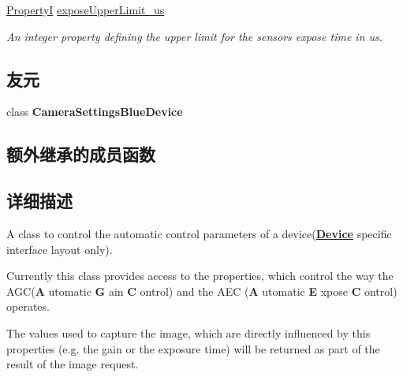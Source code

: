 \begin{DoxyCompactItemize}
\hyperlink{group___common_interface_ga12d5e434238ca242a1ba4c6c3ea45780}{Property\+I} \hyperlink{classmv_i_m_p_a_c_t_1_1acquire_1_1_auto_control_parameters_a31bdff657d33b72b9da836a2cdd61fea}{expose\+Upper\+Limit\+\_\+us}
\begin{DoxyCompactList}\small\item\em An integer property defining the upper limit for the sensors expose time in us. \end{DoxyCompactList}\end{DoxyCompactItemize}
\subsection*{友元}
\begin{DoxyCompactItemize}
\item 
\hypertarget{classmv_i_m_p_a_c_t_1_1acquire_1_1_auto_control_parameters_ab0b1cfcd287092b768c6b4206fb0ada0}{class {\bfseries Camera\+Settings\+Blue\+Device}}\label{classmv_i_m_p_a_c_t_1_1acquire_1_1_auto_control_parameters_ab0b1cfcd287092b768c6b4206fb0ada0}

\end{DoxyCompactItemize}
\subsection*{额外继承的成员函数}


\subsection{详细描述}
A class to control the automatic control parameters of a device({\bfseries \hyperlink{classmv_i_m_p_a_c_t_1_1acquire_1_1_device}{Device}} specific interface layout only). 

Currently this class provides access to the properties, which control the way the A\+G\+C({\bfseries A} utomatic {\bfseries G} ain {\bfseries C} ontrol) and the A\+E\+C ({\bfseries A} utomatic {\bfseries E} xpose {\bfseries C} ontrol) operates.

The values used to capture the image, which are directly influenced by this properties (e.\+g. the gain or the exposure time) will be returned as part of the result of the image request.

